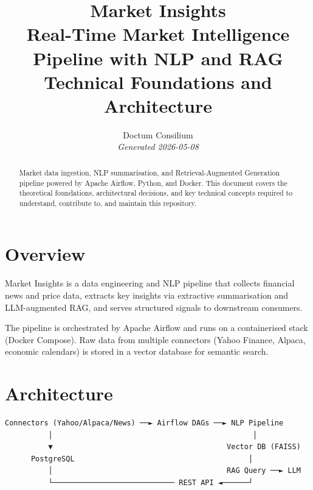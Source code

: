 \documentclass[11pt,a4paper]{article}
\begin{document}
\title{
  \textcolor{doctum}{\Large\textbf{Market Insights}} \\[0.5em]
  \large Real-Time Market Intelligence Pipeline with NLP and RAG \\[0.3em]
  \normalsize Technical Foundations and Architecture
}
\author{Doctum Consilium \\ \small\textit{Generated 2026-05-08}}
\date{}
\maketitle
\thispagestyle{fancy}

\begin{abstract}
Market data ingestion, NLP summarisation, and Retrieval-Augmented Generation pipeline powered by Apache Airflow, Python, and Docker.
This document covers the theoretical foundations, architectural decisions,
and key technical concepts required to understand, contribute to, and
maintain this repository.
\end{abstract}

\tableofcontents
\newpage

\section{Overview}

Market Insights is a data engineering and NLP pipeline that collects financial
news and price data, extracts key insights via extractive summarisation and
LLM-augmented RAG, and serves structured signals to downstream consumers.

The pipeline is orchestrated by Apache Airflow and runs on a containerised
stack (Docker Compose). Raw data from multiple connectors (Yahoo Finance,
Alpaca, economic calendars) is stored in a vector database for semantic search.


\section{Architecture}

\begin{verbatim}
Connectors (Yahoo/Alpaca/News) ──► Airflow DAGs ──► NLP Pipeline
          │                                              │
          ▼                                        Vector DB (FAISS)
      PostgreSQL                                        │
          │                                        RAG Query ──► LLM
          └──────────────────────────── REST API ◄──────┘
\end{verbatim}
\end{document}
